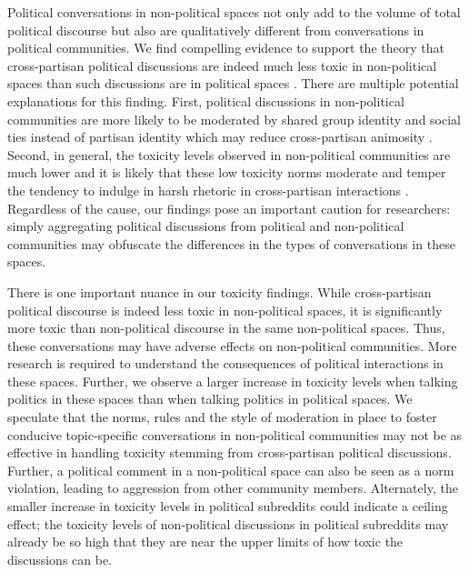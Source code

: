 \documentclass[letterpaper]{article} %
\begin{document}
Political conversations in non-political spaces not only add to the volume of total political discourse but also are qualitatively different from conversations in political communities. We find compelling evidence to support the theory that cross-partisan political discussions are indeed much less toxic in non-political spaces than such discussions are in political spaces \cite{wright2015third}. There are multiple potential explanations for this finding. First, political discussions in non-political communities are more likely to be moderated by shared group identity \cite{levendusky2018americans} and social ties \cite{birchall2020trying} instead of partisan identity which may reduce cross-partisan animosity \cite{gaertner2011common}. Second, in general, the toxicity levels observed in non-political communities are much lower and it is likely that these low toxicity norms moderate and temper the tendency to indulge in harsh rhetoric in cross-partisan interactions \cite{iyengar2015fear}.
Regardless of the cause, our findings pose an important caution for researchers: simply aggregating political discussions from political and non-political communities may obfuscate the differences in the types of conversations in these spaces.


There is one important nuance in our toxicity findings. While cross-partisan political discourse is indeed less toxic in non-political spaces, it is significantly more toxic than non-political discourse in the same non-political spaces. Thus, these conversations may have adverse effects on non-political communities. More research is required to understand the consequences of political interactions in these spaces. Further, we observe a larger increase in toxicity levels when talking politics in these spaces than when talking politics in political spaces. We speculate that the norms, rules and the style of moderation in place to foster conducive topic-specific conversations in non-political communities may not be as effective in handling toxicity stemming from cross-partisan political discussions. Further, a political comment in a non-political space can also be seen as a norm violation, leading to aggression from other community members. Alternately, the smaller increase in toxicity levels in political subreddits could indicate a ceiling effect; the toxicity levels of non-political discussions in political subreddits may already be so high that they are near the upper limits of how toxic the discussions can be.
\end{document}
